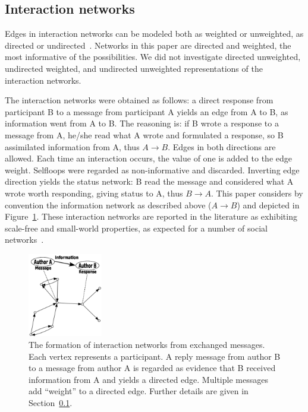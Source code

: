 \subsection{Interaction networks}\label{intNet}
Edges in interaction networks can be modeled both as weighted or unweighted, as directed or undirected~\cite{bird,newmanCommunityDirected,newmanCommunity2013}.
Networks in this paper are directed and weighted, the most informative of the possibilities. We did not investigate directed unweighted, undirected weighted, and undirected unweighted representations of the interaction networks. 

The interaction networks were obtained as follows: a direct response from participant B to a message from participant A yields an edge from A to B, as information went from A to B. The reasoning is: if B wrote a response to a message from A, he/she read what A wrote and formulated a response, so B assimilated information from A, thus $A \rightarrow B$.
Edges in both directions are allowed. Each time an interaction occurs, the value of one is added to the edge weight. Selfloops were regarded as non-informative and discarded. Inverting edge direction yields the status network: B read the message and considered what A wrote worth responding, giving status to A, thus $B\rightarrow A$. This paper considers by convention the information network as described above ($A\rightarrow B$) and depicted in Figure~\ref{formationNetwork}. These interaction networks are reported in the literature as exhibiting scale-free and small-world properties, as expected for a number of social networks~\cite{bird,newmanBook}.

\begin{figure}[!h]
\centering
\includegraphics[width=0.29\textwidth]{figs/criaRede3_}
\caption{The formation of interaction networks from exchanged messages. Each vertex represents a participant. A reply message from author B to a message from author A is regarded as evidence that B received information from A and yields a directed edge. 	Multiple messages add ``weight'' to a directed edge. Further details are given in Section~\ref{intNet}.}
\label{formationNetwork}
\end{figure}


